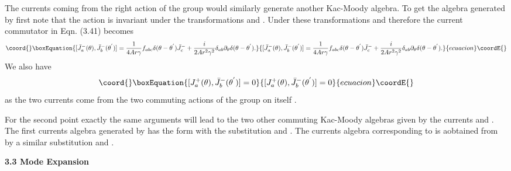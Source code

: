 \documentclass[a4paper,12pt]{article}
\begin{document}
The currents \coordHE{} 
coming from the right action of the group would similarly generate another
Kac-Moody algebra. To get the
 algebra generated by  \coordHE{} first note 
that the action is invariant under
 the transformations  
\myHighlight{${\theta}{\longrightarrow}-{\theta}$}\coordHE{} and 
\coordHE{} . 
Under these transformations \coordHE{} 
and therefore the current commutator in   Eqn. (3.41) becomes
\begin{equation}\coord{}\boxEquation{
[ {\bar{J}}^{-}_a(\theta) , {\bar{J}}^{-}_b({\theta}^{'}) ]=
\frac{1}{4Ar{\gamma}} f_{abc} {\delta}({\theta} 
-{\theta}^{'}) {\bar{J}}^{-}_{c} +\frac{i}{2Ar^2{\gamma}^2}
{\delta}_{ab}{\partial}_{\theta}{\delta}({\theta} -{\theta}^{'}) .
}{
[ {\bar{J}}^{-}_a(\theta) , {\bar{J}}^{-}_b({\theta}^{'}) ]=
\frac{1}{4Ar{\gamma}} f_{abc} {\delta}({\theta} 
-{\theta}^{'}) {\bar{J}}^{-}_{c} +\frac{i}{2Ar^2{\gamma}^2}
{\delta}_{ab}{\partial}_{\theta}{\delta}({\theta} -{\theta}^{'}) .
}{ecuacion}\coordE{}\end{equation} 
We also have 
\begin{equation}\coord{}\boxEquation{
[J^{+}_{a}(\theta),{\bar{J}}^{-}_{b}({\theta}^{'})]=0
}{
[J^{+}_{a}(\theta),{\bar{J}}^{-}_{b}({\theta}^{'})]=0
}{ecuacion}\coordE{}\end{equation}
as the two currents come from the two commuting 
actions of the group on itself .

For the second point \coordHE{} 
exactly the same arguments will 
lead to the two other commuting 
Kac-Moody algebras given by the currents
 \coordHE{} and \coordHE{} . The first
 currents algebra generated by \coordHE{} has the form \coordHE{} with
 the substitution \coordHE{} and 
\coordHE{} . The currents algebra corresponding
 to \coordHE{} is aobtained from \coordHE{} by
 a similar substitution \coordHE{} 
and \coordHE{} .

\vskip 5mm
\noindent
{\bf 3.3 Mode Expansion}
\vskip 5mm
\noindent
\end{document}
